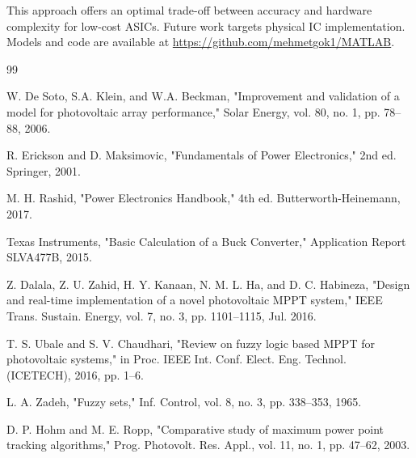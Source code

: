 \documentclass[conference]{IEEEtran}
\begin{document}
This approach offers an optimal trade-off between accuracy and hardware complexity for low-cost ASICs. Future work targets physical IC implementation. Models and code are available at \url{https://github.com/mehmetgok1/MATLAB}.
\begin{thebibliography}{99}

 W. De Soto, S.A. Klein, and W.A. Beckman, "Improvement and validation of a model for photovoltaic array performance," Solar Energy, vol. 80, no. 1, pp. 78--88, 2006.

 R. Erickson and D. Maksimovic, "Fundamentals of Power Electronics," 2nd ed. Springer, 2001.

 M. H. Rashid, "Power Electronics Handbook," 4th ed. Butterworth-Heinemann, 2017.

 Texas Instruments, "Basic Calculation of a Buck Converter," Application Report SLVA477B, 2015.

 Z. Dalala, Z. U. Zahid, H. Y. Kanaan, N. M. L. Ha, and D. C. Habineza, "Design and real-time implementation of a novel photovoltaic MPPT system," IEEE Trans. Sustain. Energy, vol. 7, no. 3, pp. 1101–1115, Jul. 2016.

 T. S. Ubale and S. V. Chaudhari, "Review on fuzzy logic based MPPT for photovoltaic systems," in Proc. IEEE Int. Conf. Elect. Eng. Technol. (ICETECH), 2016, pp. 1–6.

 L. A. Zadeh, "Fuzzy sets," Inf. Control, vol. 8, no. 3, pp. 338–353, 1965.

 D. P. Hohm and M. E. Ropp, "Comparative study of maximum power point tracking algorithms," Prog. Photovolt. Res. Appl., vol. 11, no. 1, pp. 47–62, 2003.

\end{thebibliography}
\end{document}
